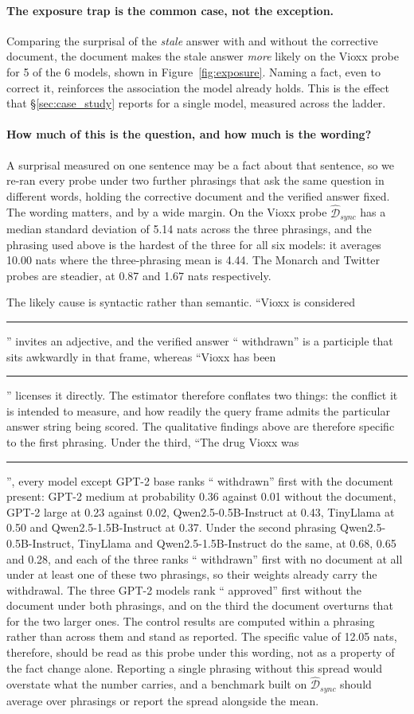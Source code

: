 \documentclass[10pt]{article}
\begin{document}
\paragraph{The exposure trap is the common case, not the exception.} Comparing
the surprisal of the \textit{stale} answer with and without the corrective
document, the document makes the stale answer \textit{more} likely on the Vioxx
probe for 5 of the 6 models, shown in Figure~\ref{fig:exposure}. Naming a
fact, even to correct it, reinforces the association the model already holds. This is the effect that
\S\ref{sec:case_study} reports for a single model, measured across the ladder.

\paragraph{How much of this is the question, and how much is the wording?} A
surprisal measured on one sentence may be a fact about that sentence, so we
re-ran every probe under two further phrasings that ask the same question in
different words, holding the corrective document and the verified answer fixed.
The wording matters, and by a wide margin. On the Vioxx probe
$\widehat{\mathcal{D}}_{sync}$ has a median standard deviation of 5.14 nats
across the three phrasings, and the phrasing used above is the hardest of the
three for all six models: it averages 10.00 nats where the three-phrasing mean is
4.44. The Monarch and Twitter probes are steadier, at 0.87 and 1.67 nats
respectively.

The likely cause is syntactic rather than semantic. ``Vioxx is
considered~\rule{6mm}{0.4pt}'' invites an adjective, and the verified answer
`` withdrawn'' is a participle that sits awkwardly in that frame, whereas
``Vioxx has been~\rule{6mm}{0.4pt}'' licenses it directly. The estimator
therefore conflates two things: the conflict it is intended to measure, and how
readily the query frame admits the particular answer string being scored. The
qualitative findings above are therefore specific to the first phrasing. Under
the third, ``The drug Vioxx was~\rule{6mm}{0.4pt}'', every model except GPT-2
base ranks `` withdrawn'' first with the document present: GPT-2 medium at
probability 0.36 against 0.01 without the document, GPT-2 large at 0.23
against 0.02, Qwen2.5-0.5B-Instruct at 0.43, TinyLlama at 0.50 and
Qwen2.5-1.5B-Instruct at 0.37. Under the second phrasing Qwen2.5-0.5B-Instruct,
TinyLlama and Qwen2.5-1.5B-Instruct do the same, at 0.68, 0.65 and 0.28, and
each of the three ranks `` withdrawn'' first with no document at all under at
least one of these two phrasings, so their weights already carry the
withdrawal. The three GPT-2 models rank `` approved'' first without the
document under both phrasings, and on the third the document overturns that
for the two larger ones. The control results are computed within a phrasing
rather than across them and stand as reported. The specific value of 12.05
nats, therefore, should be read as this probe under this wording, not as a
property of the fact change alone. Reporting a single phrasing without this
spread would overstate what the number carries, and a benchmark built on
$\widehat{\mathcal{D}}_{sync}$ should average over phrasings or report the
spread alongside the mean.
\end{document}
